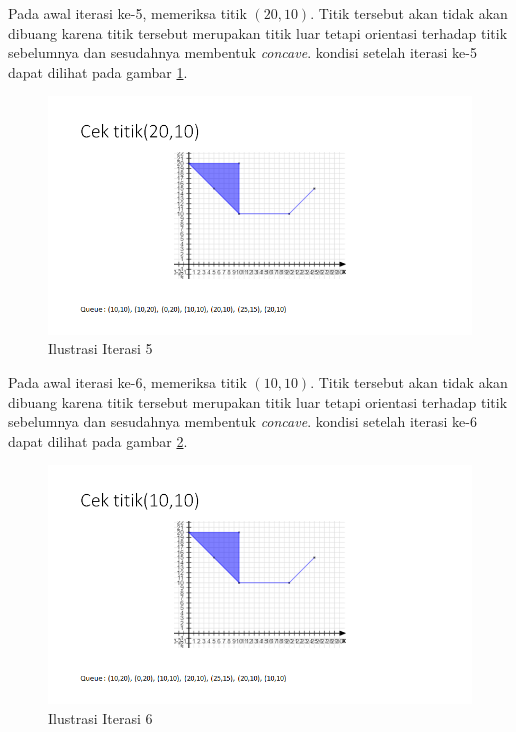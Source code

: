 \par Pada awal iterasi ke-5, memeriksa titik $(20,10)$. Titik tersebut akan tidak akan dibuang karena titik tersebut merupakan titik luar tetapi orientasi terhadap titik sebelumnya dan sesudahnya membentuk \textit{concave}. kondisi setelah iterasi ke-5 dapat dilihat pada gambar \ref{fig:iterasi-5}.
\begin{figure}[!h]
	\Centering
	\includegraphics [width=\columnwidth]{bab5/img/iterasi-5}
	\caption {Ilustrasi Iterasi 5}
	\label {fig:iterasi-5}
\end{figure}

\par Pada awal iterasi ke-6, memeriksa titik $(10,10)$. Titik tersebut akan tidak akan dibuang karena titik tersebut merupakan titik luar tetapi orientasi terhadap titik sebelumnya dan sesudahnya membentuk \textit{concave}. kondisi setelah iterasi ke-6 dapat dilihat pada gambar \ref{fig:iterasi-6}.
\begin{figure}[!h]
	\Centering
	\includegraphics [width=\columnwidth]{bab5/img/iterasi-6}
	\caption {Ilustrasi Iterasi 6}
	\label {fig:iterasi-6}
\end{figure}

